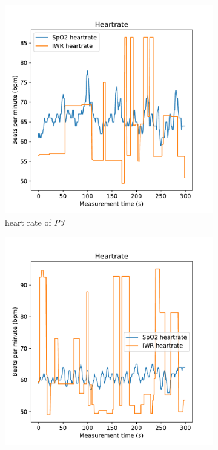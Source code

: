 \begin{figure}[t]
\centering
\begin{subfigure}{.45\textwidth}
  \centering
  \includegraphics[width=\linewidth]{figures/validation/roy4_heart.pdf}  
  \caption{heart rate of \emph{P3}}
  \label{fig:roy4_heart}
\end{subfigure}
\begin{subfigure}{.45\textwidth}
  \centering
  \includegraphics[width=\linewidth]{figures/validation/nick4_heart.pdf}  

\end{subfigure}
\end{figure}
